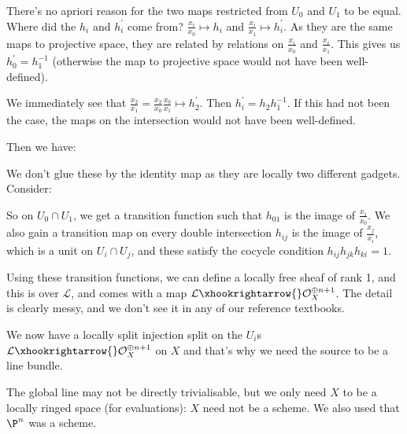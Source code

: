 There's no apriori reason for the two maps restricted from $U_0$ and $U_1$ to be equal.
Where did the $h_i$ and $h_i^\prime$ come from? $\frac{x_i}{x_0}\mapsto h_i$ and $\frac{x_i}{x_1}\mapsto h_i^\prime$.
As they are the same maps to projective space, they are related by relations on $\frac{x_i}{x_0}$ and $\frac{x_i}{x_1}$.
This gives us $h_0^\prime=h_1^{-1}$ (otherwise the map to projective space would not have been well-defined).

We immediately see that $\frac{x_2}{x_1}=\frac{x_2}{x_0}\frac{x_0}{x_1}\mapsto h_2^\prime$.
Then $h_i^\prime=h_2h_1^{-1}$.
If this had not been the case, the maps on the intersection would not have been well-defined.

Then we have:
\begin{figure}[H]
    \centering
\end{figure}

We don't glue these by the identity map as they are locally two different gadgets.
Consider:
\begin{figure}[H]
    \centering
\end{figure}

So on $U_0\cap U_1$, we get a transition function such that $h_{01}$ is the image of $\frac{x_1}{x_0}$.
We also gain a transition map on every double intersection $h_{ij}$ is the image of $\frac{x_j}{x_i}$, which is a unit on $U_i\cap U_j$, and these satisfy the cocycle condition $h_{ij}h_{jk}h_{ki}=1$.

Using these transition functions, we can define a locally free sheaf of rank 1, and this is over $\mathcal{L}$, and comes with a map $\mathcal{L}\xhookrightarrow{}\mathcal{O}_X^{\oplus n+1}$.
The detail is clearly messy, and we don't see it in any of our reference textbooks.

We now have a locally split injection split on the $U_i$s $\mathcal{L}\xhookrightarrow{}\mathcal{O}_X^{\oplus n+1}$ on $X$ and that's why we need the source to be a line bundle.

The global line may not be directly trivialisable, but we only need $X$ to be a locally ringed space (for evaluations): $X$ need not be a scheme.
We also used that $\P^n$ was a scheme.
